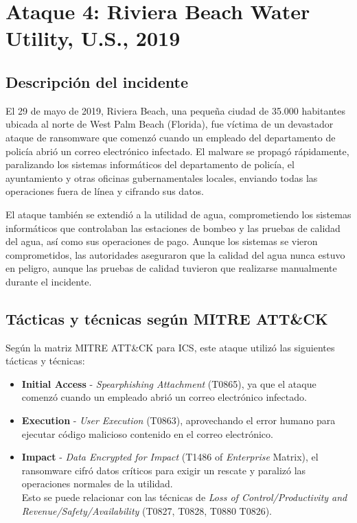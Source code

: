 \section{Ataque 4: Riviera Beach Water Utility, U.S., 2019}

\subsection{Descripción del incidente}
El 29 de mayo de 2019, Riviera Beach, una pequeña ciudad de 35.000 habitantes ubicada al norte de West Palm Beach (Florida), fue víctima de un devastador ataque de ransomware que comenzó cuando un empleado del departamento de policía abrió un correo electrónico infectado. El malware se propagó rápidamente, paralizando los sistemas informáticos del departamento de policía, el ayuntamiento y otras oficinas gubernamentales locales, enviando todas las operaciones fuera de línea y cifrando sus datos.

El ataque también se extendió a la utilidad de agua, comprometiendo los sistemas informáticos que controlaban las estaciones de bombeo y las pruebas de calidad del agua, así como sus operaciones de pago. Aunque los sistemas se vieron comprometidos, las autoridades aseguraron que la calidad del agua nunca estuvo en peligro, aunque las pruebas de calidad tuvieron que realizarse manualmente durante el incidente.


\subsection{Tácticas y técnicas según MITRE ATT\&CK}
Según la matriz MITRE ATT\&CK para ICS, este ataque utilizó las siguientes tácticas y técnicas:

\begin{itemize}
    \item \textbf{Initial Access} - \textit{Spearphishing Attachment} (T0865), ya que el ataque comenzó cuando un empleado abrió un correo electrónico infectado.
    
    \item \textbf{Execution} - \textit{User Execution} (T0863), aprovechando el error humano para ejecutar código malicioso contenido en el correo electrónico.
    
    \item \textbf{Impact} - \textit{Data Encrypted for Impact} (T1486 of \textit{Enterprise} Matrix), el ransomware cifró datos críticos para exigir un rescate y paralizó las operaciones normales de la utilidad.\\
    Esto se puede relacionar con las técnicas de \textit{Loss of Control/Productivity and Revenue/Safety/Availability} (T0827, T0828, T0880 T0826).
\end{itemize}

